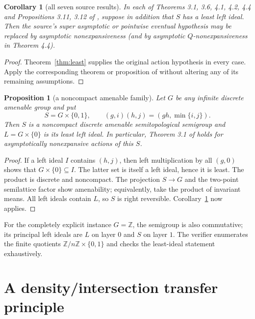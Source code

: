 \documentclass[11pt]{article}
\newtheorem{proposition}[theorem]{Proposition}
\newtheorem{corollary}[theorem]{Corollary}
\theoremstyle{definition}
\theoremstyle{remark}
\begin{document}
\begin{corollary}[all seven source results]\label{cor:seven}
In each of Theorems 3.1, 3.6, 4.1, 4.2, 4.4 and Propositions 3.11, 3.12 of
\cite{MW}, suppose in addition that $S$ has a least left ideal.  Then the
source's super asymptotic or pointwise eventual hypothesis may be replaced by
asymptotic nonexpansiveness (and by asymptotic $Q$-nonexpansiveness in
Theorem 4.4).
\end{corollary}

\begin{proof}
Theorem~\ref{thm:least} supplies the original action hypothesis in every
case.  Apply the corresponding theorem or proposition of \cite{MW} without
altering any of its remaining assumptions.
\end{proof}

\begin{proposition}[a noncompact amenable family]\label{prop:example}
Let $G$ be any infinite discrete amenable group and put
\[
 S=G\times\{0,1\},\qquad (g,i)(h,j)=(gh,\min\{i,j\}).
\]
Then $S$ is a noncompact discrete amenable semitopological semigroup and
$L=G\times\{0\}$ is its least left ideal.  In particular, Theorem 3.1 of
\cite{MW} holds for asymptotically nonexpansive actions of this $S$.
\end{proposition}

\begin{proof}
If a left ideal $I$ contains $(h,j)$, then left multiplication by all
$(g,0)$ shows that $G\times\{0\}\subseteq I$.  The latter set is itself a
left ideal, hence it is least.  The product is discrete and noncompact.  The
projection $S\to G$ and the two-point semilattice factor show amenability;
equivalently, take the product of invariant means.  All left ideals contain
$L$, so $S$ is right reversible.  Corollary~\ref{cor:seven} now applies.
\end{proof}

For the completely explicit instance $G=\mathbb Z$, the semigroup is also
commutative; its principal left ideals are $L$ on layer $0$ and $S$ on layer
$1$.  The verifier enumerates the finite quotients
$\mathbb Z/n\mathbb Z\times\{0,1\}$ and checks the least-ideal statement
exhaustively.

\section{A density/intersection transfer principle}
\end{document}
